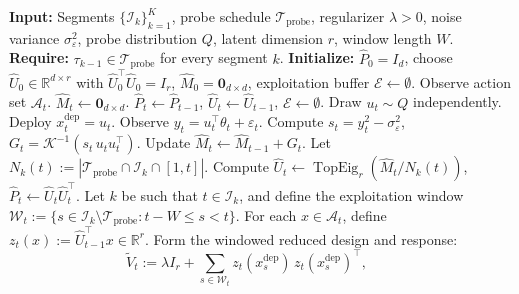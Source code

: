 \documentclass{article}
\newcommand{\R}{\mathbb{R}}
\newcommand{\cA}{\mathcal{A}}
\newcommand{\cI}{\mathcal{I}}
\newcommand{\cTprobe}{\mathcal{T}_{\mathrm{probe}}}
\DeclareMathOperator{\TopEig}{TopEig}
\begin{document}
\begin{algorithm}[t]
  \caption{Single-Play Subspace-Aware Control with Windowed $r$-Dimensional Exploitation}
  \label{alg:single_play_control_rdim}
  \begin{algorithmic}[1]
  \State \textbf{Input:} Segments $\{\cI_k\}_{k=1}^K$, probe schedule $\cTprobe$,
         regularizer $\lambda > 0$, noise variance $\sigma_\varepsilon^2$,
         probe distribution $Q$, latent dimension $r$, window length $W$.
  \State \textbf{Require:} $\tau_{k-1} \in \cTprobe$ for every segment $k$.
  \State \textbf{Initialize:} $\widehat P_0 = I_d$, choose $\widehat U_0 \in \R^{d\times r}$
         with $\widehat U_0^\top \widehat U_0 = I_r$, $\widehat M_0 = \mathbf{0}_{d\times d}$,
         exploitation buffer $\mathcal{E} \leftarrow \emptyset$.
      \State Observe action set $\cA_t$.
          \State $\widehat M_t \leftarrow \mathbf{0}_{d\times d}$.
          \State $\widehat P_t \leftarrow \widehat P_{t-1}$,\quad
                 $\widehat U_t \leftarrow \widehat U_{t-1}$,\quad
                 $\mathcal{E} \leftarrow \emptyset$.
      \EndIf
      \If{$t \in \cTprobe$}
          \State Draw $u_t \sim Q$ independently.
          \State Deploy $x_t^{\mathrm{dep}} = u_t$.
          \State Observe $y_t = u_t^\top \theta_t + \varepsilon_t$.
          \State Compute
                 $s_t = y_t^2 - \sigma_\varepsilon^2$, \quad
                 $G_t = \mathcal K^{-1}(s_t\, u_t u_t^\top)$.
          \State Update $\widehat M_t \leftarrow \widehat M_{t-1} + G_t$.
          \State Let $N_k(t) := |\cTprobe \cap \cI_k \cap [1,t]|$.
          \State Compute
                 $\widehat U_t \leftarrow \TopEig_r(\widehat M_t / N_k(t))$, \quad
                 $\widehat P_t \leftarrow \widehat U_t \widehat U_t^\top$.
      \Else
          \State Let $k$ be such that $t \in \cI_k$, and define the exploitation window
                 $\mathcal W_t := \{s \in \cI_k \setminus \cTprobe : t-W \le s < t\}$.
          \State For each $x \in \cA_t$, define
                 $z_t(x) := \widehat U_{t-1}^\top x \in \R^r$.
          \State Form the windowed reduced design and response:
          \[
              \widetilde V_t
              :=
              \lambda I_r
              + \sum_{s\in\mathcal W_t}
                z_t(x_s^{\mathrm{dep}})\, z_t(x_s^{\mathrm{dep}})^\top,
              \qquad
\]
\end{algorithmic}
\end{algorithm}
\end{document}
